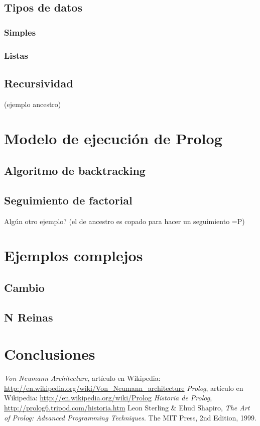 \documentclass{article}
\begin{document}
\subsection{Tipos de datos}
\subsubsection{Simples}
\subsubsection{Listas}
\subsection{Recursividad}
(ejemplo ancestro)

\newpage
\section{Modelo de ejecución de Prolog}
\subsection{Algoritmo de backtracking}
\subsection{Seguimiento de factorial}
    Algún otro ejemplo? (el de ancestro es copado para hacer un seguimiento =P)

\newpage
\section{Ejemplos complejos}
\subsection{Cambio}
\subsection{N Reinas}

\newpage
\section{Conclusiones}


\clearpage
\begin{thebibliography}{9}
     \emph{Von Neumann Architecture}, artículo en Wikipedia: \url{http://en.wikipedia.org/wiki/Von\_Neumann\_architecture}
     \emph{Prolog}, artículo en Wikipedia: \url{http://en.wikipedia.org/wiki/Prolog}
     \emph{Historia de Prolog}, \url{http://prolog6.tripod.com/historia.htm}
     Leon Sterling \& Ehud Shapiro, \emph{The Art of Prolog: Advanced Programming Techniques}. The MIT Press, 2nd Edition, 1999.
\end{thebibliography}

\end{document}
